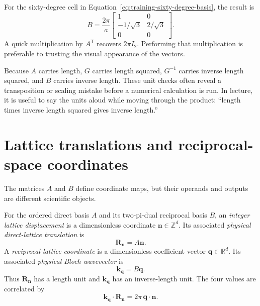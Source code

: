 For the sixty-degree cell in
Equation~\eqref{eq:training-sixty-degree-basis}, the result is
\begin{equation}
  B=\frac{2\pi}{a}
  \begin{bmatrix}
    1 & 0\\
    -1/\sqrt{3} & 2/\sqrt{3}\\
    0 & 0
  \end{bmatrix}.
  \label{eq:training-sixty-degree-dual}
\end{equation}
A quick multiplication by $A^{\mathsf T}$ recovers $2\pi I_2$. Performing that
multiplication is preferable to trusting the visual appearance of the vectors.

Because $A$ carries length, $G$ carries length squared, $G^{-1}$ carries inverse
length squared, and $B$ carries inverse length. These unit checks often reveal a
transposition or scaling mistake before a numerical calculation is run. In
lecture, it is useful to say the units aloud while moving through the product:
``length times inverse length squared gives inverse length.''

\section{Lattice translations and reciprocal-space coordinates}

The matrices $A$ and $B$ define coordinate maps, but their operands and outputs
are different scientific objects.

\begin{definition}
\label{def:training-periodic-coordinate-values}
For the ordered direct basis $A$ and its two-pi-dual reciprocal basis $B$, an
\emph{integer lattice displacement} is a dimensionless coordinate
$\mathbf n\in\mathbb Z^d$. Its associated \emph{physical direct-lattice
translation} is
\begin{equation}
  \mathbf R_{\mathbf n}=A\mathbf n.
  \label{eq:training-direct-lattice-translation}
\end{equation}
A \emph{reciprocal-lattice coordinate} is a dimensionless coefficient vector
$\mathbf q\in\mathbb R^d$. Its associated \emph{physical Bloch wavevector} is
\begin{equation}
  \mathbf k_{\mathbf q}=B\mathbf q.
  \label{eq:training-reciprocal-coordinate-wavevector}
\end{equation}
Thus $\mathbf R_{\mathbf n}$ has a length unit and $\mathbf k_{\mathbf q}$ has
an inverse-length unit. The four values are correlated by
\begin{equation}
  \mathbf k_{\mathbf q}\cdot\mathbf R_{\mathbf n}
  =2\pi\,\mathbf q\cdot\mathbf n.
  \label{eq:training-direct-reciprocal-pairing}
\end{equation}
\end{definition}

